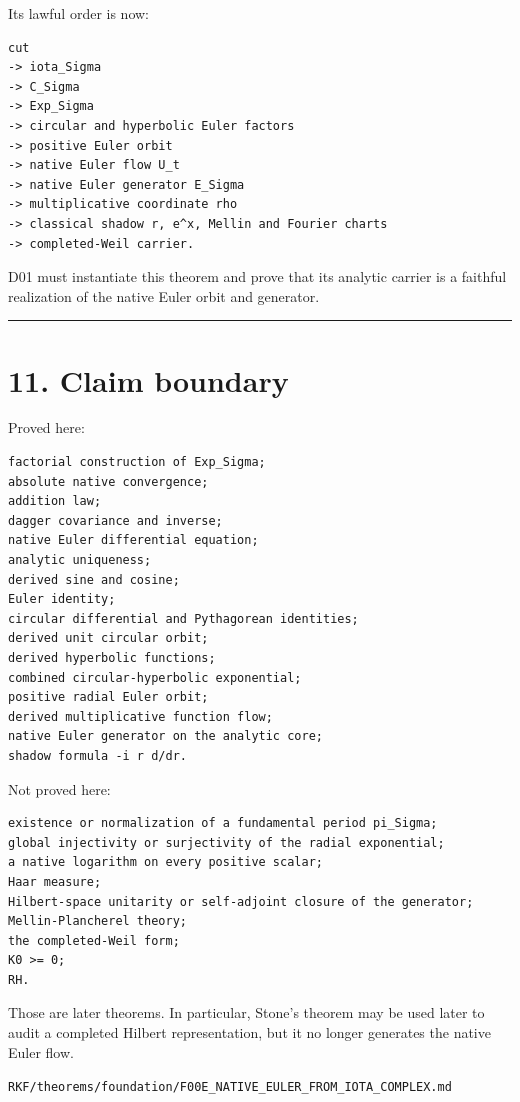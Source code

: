Its lawful order is now:

\begin{verbatim}
cut
-> iota_Sigma
-> C_Sigma
-> Exp_Sigma
-> circular and hyperbolic Euler factors
-> positive Euler orbit
-> native Euler flow U_t
-> native Euler generator E_Sigma
-> multiplicative coordinate rho
-> classical shadow r, e^x, Mellin and Fourier charts
-> completed-Weil carrier.
\end{verbatim}

D01 must instantiate this theorem and prove that its analytic carrier is a
faithful realization of the native Euler orbit and generator.

\begin{center}\rule{0.5\linewidth}{0.5pt}\end{center}

\hypertarget{claim-boundary}{%
\section{11. Claim boundary}\label{claim-boundary}}

Proved here:

\begin{verbatim}
factorial construction of Exp_Sigma;
absolute native convergence;
addition law;
dagger covariance and inverse;
native Euler differential equation;
analytic uniqueness;
derived sine and cosine;
Euler identity;
circular differential and Pythagorean identities;
derived unit circular orbit;
derived hyperbolic functions;
combined circular-hyperbolic exponential;
positive radial Euler orbit;
derived multiplicative function flow;
native Euler generator on the analytic core;
shadow formula -i r d/dr.
\end{verbatim}

Not proved here:

\begin{verbatim}
existence or normalization of a fundamental period pi_Sigma;
global injectivity or surjectivity of the radial exponential;
a native logarithm on every positive scalar;
Haar measure;
Hilbert-space unitarity or self-adjoint closure of the generator;
Mellin-Plancherel theory;
the completed-Weil form;
K0 >= 0;
RH.
\end{verbatim}

Those are later theorems. In particular, Stone's theorem may be used later to
audit a completed Hilbert representation, but it no longer generates the native
Euler flow.

\begin{flushright}\small\texttt{RKF/theorems/foundation/F00E\_NATIVE\_EULER\_FROM\_IOTA\_COMPLEX.md}\end{flushright}
